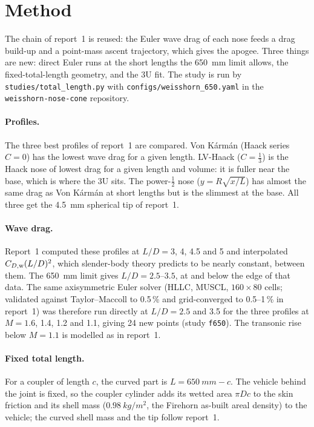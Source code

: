 \section{Method}
\label{sec:method}

The chain of report~1 is reused: the Euler wave drag of each nose feeds a drag build-up and a
point-mass ascent trajectory, which gives the apogee. Three things are new: direct Euler runs at the
short lengths the \SI{650}{mm} limit allows, the fixed-total-length geometry, and the 3U fit. The study is run by
\texttt{studies/total\_length.py} with \texttt{configs/weisshorn\_650.yaml} in the
\texttt{weisshorn-nose-cone} repository.

\paragraph{Profiles.} The three best profiles of report~1 are compared. Von K\'arm\'an (Haack
series $C=0$) has the lowest wave drag for a given length. LV-Haack ($C=\tfrac13$) is the Haack
nose of lowest drag for a given length and volume: it is fuller near the base, which is where the
3U sits. The power-$\tfrac12$ nose ($y = R\sqrt{x/L}$) has almost the same drag as
Von K\'arm\'an at short lengths but is the slimmest at the base. All three get the \SI{4.5}{mm}
spherical tip of report~1.

\paragraph{Wave drag.} Report~1 computed these profiles at $L/D = 3$, 4, 4.5 and 5 and interpolated
$C_{D,\rm w}(L/D)^2$, which slender-body theory predicts to be nearly constant, between them. The
\SI{650}{mm} limit gives $L/D = 2.5$--$3.5$, at and below the edge of that data. The same
axisymmetric Euler solver (HLLC, MUSCL, $160\times80$ cells; validated against Taylor--Maccoll to
0.5\,\% and grid-converged to 0.5--1\,\% in report~1) was therefore run directly at $L/D = 2.5$
and 3.5 for the three profiles at $M = 1.6$, 1.4, 1.2 and 1.1, giving 24 new points (study
\texttt{f650}). The transonic rise below $M = 1.1$ is modelled as in report~1.

\paragraph{Fixed total length.} For a coupler of length $c$, the curved part is
$L = \SI{650}{mm} - c$. The vehicle behind the joint is fixed, so the coupler cylinder adds its
wetted area $\pi D c$ to the skin friction and its shell mass ($\SI{0.98}{kg/m^2}$, the Firehorn
as-built areal density) to the vehicle; the curved shell mass and the tip follow report~1.

